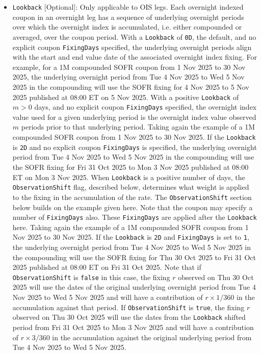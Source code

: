 \begin{itemize}
\item \lstinline!Lookback! [Optional]: Only applicable to OIS legs. Each overnight indexed coupon in an overnight 
  leg has a sequence of underlying overnight periods over which the overnight index is accumulated, i.e. either 
  compounded or averaged, over the coupon period.
  With a \lstinline!Lookback! of \lstinline!0D!, the default, and no explicit coupon \lstinline!FixingDays! specified, 
  the underlying overnight periods align with the start and end value date of the associated overnight index fixing.
  For example, for a 1M compounded SOFR coupon from 1 Nov 2025 to 30 Nov 2025, the underlying overnight period from 
  Tue 4 Nov 2025 to Wed 5 Nov 2025 in the compounding will use the SOFR fixing for 4 Nov 2025 to 5 Nov 2025 published 
  at 08:00 ET on 5 Nov 2025.
  With a positive \lstinline!Lookback! of $m > 0$ days, and no explicit coupon \lstinline!FixingDays! specified, the 
  overnight index value used for a given underlying period is the overnight index value observed $m$ periods prior 
  to that underlying period.
  Taking again the example of a 1M compounded SOFR coupon from 1 Nov 2025 to 30 Nov 2025. If the \lstinline!Lookback! 
  is \lstinline!2D! and no explicit coupon \lstinline!FixingDays! is specified, the underlying overnight period from 
  Tue 4 Nov 2025 to Wed 5 Nov 2025 in the compounding will use the SOFR fixing for Fri 31 Oct 2025 to Mon 3 Nov 2025 
  published at 08:00 ET on Mon 3 Nov 2025.
  When \lstinline!Lookback! is a positive number of days, the \lstinline!ObservationShift! flag, described below, 
  determines what weight is applied to the fixing in the accumulation of the rate. The \lstinline!ObservationShift! 
  section below builds on the example given here.
  Note that the coupon may specify a number of \lstinline!FixingDays! also. These \lstinline!FixingDays! are applied 
  after the \lstinline!Lookback! here.
  Taking again the example of a 1M compounded SOFR coupon from 1 Nov 2025 to 30 Nov 2025. If the \lstinline!Lookback! 
  is \lstinline!2D! and \lstinline!FixingDays! is set to \lstinline!1!, the underlying overnight period from 
  Tue 4 Nov 2025 to Wed 5 Nov 2025 in the compounding will use the SOFR fixing for Thu 30 Oct 2025 to Fri 31 Oct 2025 
  published at 08:00 ET on Fri 31 Oct 2025. Note that if \lstinline!ObservationShift! is \lstinline!false! in this 
  case, the fixing $r$ observed on Thu 30 Oct 2025 will use the dates of the original underlying overnight period from 
  Tue 4 Nov 2025 to Wed 5 Nov 2025 and will have a contribution of $r \times 1 / 360$ in the accumulation against 
  that period.
  If \lstinline!ObservationShift! is \lstinline!true!, the fixing $r$ observed on Thu 30 Oct 2025 will use the dates 
  from the \lstinline!Lookback! shifted period from Fri 31 Oct 2025 to Mon 3 Nov 2025 and will have a contribution of 
  $r \times 3 / 360$ in the accumulation against the original underlying period from Tue 4 Nov 2025 to Wed 5 Nov 2025.


\end{itemize}
